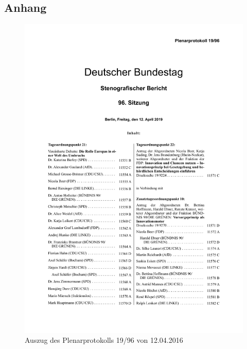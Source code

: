 \documentclass[12pt, 
    twoside=false, 
    bibliography=totoc, 
    numbers=endperiod, 
    headings=normal, 
    toc=chapterentrydotfill
    ]{scrbook}
\begin{document}
\begin{appendices}
\chapter{Anhang}

\begin{figure}[H]
    \centering
    \includegraphics[page=14,scale=0.7]{images/protokoll_beispiel.pdf}
    \caption{Auszug des Plenarprotokolls 19/96 von 12.04.2016}
    \label{fig:protokoll_bsp}
\end{figure}



\end{appendices}
\end{document}
